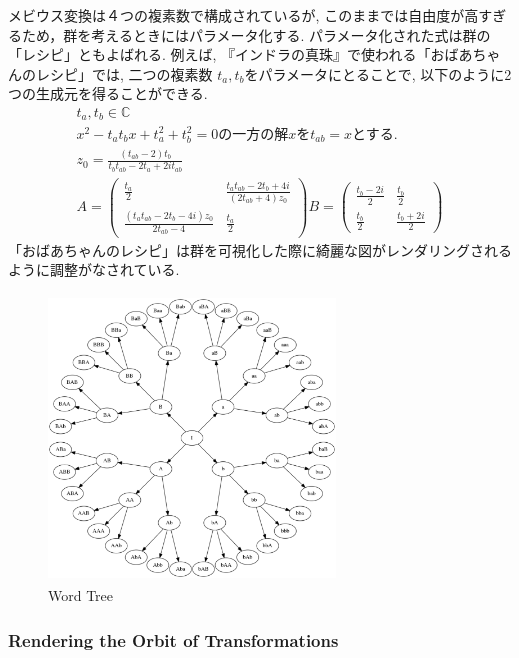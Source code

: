 メビウス変換は４つの複素数で構成されているが, このままでは自由度が高すぎ
るため，群を考えるときにはパラメータ化する.
パラメータ化された式は群の「レシピ」ともよばれる.
例えば, 『インドラの真珠』で使われる「おばあちゃんのレシピ」では, 二つの複素数
$t_a, t_b$をパラメータにとることで, 以下のように2つの生成元を得ることができる.
\begin{align*}
 t_a, t_b \in \mathbb{C} \\
 x^2 - t_a t_b x + t_a^2 + t_b^2 = 0 \text{の一方の解}x\text{を}t_{ab} = x \text{とする. }\\
 z_0 = \frac{(t_{ab} -2)t_b}{t_b t_{ab} - 2 t_a + 2it_{ab}}\\
 A = \left(
      \begin{array}{ccc}
       \frac{t_a}{2} & \frac{t_a t_{ab} - 2 t_b + 4i}{(2 t_{ab} + 4)z_0} \\
       \frac{(t_a t_{ab} - 2 t_b -4i)z_0}{2 t_{ab} - 4} & \frac{t_a}{2}
      \end{array}
     \right)
 B = \left(
      \begin{array}{ccc}
       \frac{t_b - 2i}{2} & \frac{t_b}{2} \\
       \frac{t_b}{2} & \frac{t_b + 2i}{2}
      \end{array}
     \right)
\end{align*}
「おばあちゃんのレシピ」は群を可視化した際に綺麗な図がレンダリングされるように調整がなされている.

\begin{figure}[htbp]
 \center
 \includegraphics[width=3in, height=3in, keepaspectratio]{../img/klein/wordTree.pdf}
 \caption{Word Tree}
 \label{fig:wordTree}
\end{figure}

\subsubsection{Rendering the Orbit of Transformations}

